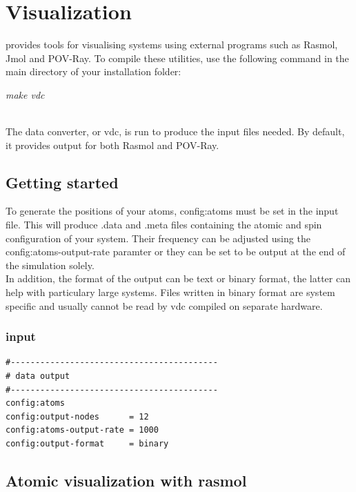 \chapter{Visualization}\label{chap:visualization}

\vampire provides tools for visualising systems using external programs such as Rasmol, Jmol and POV-Ray. To compile these utilities, use the following command in the main directory of your \vampire installation folder:

\begin{minipage}[c]{\textwidth}
\centering
\textit{make vdc}
\end{minipage}\\

 The \vampire data converter, or vdc, is run to produce the input files needed. By default, it provides output for both Rasmol and POV-Ray.


\section*{Getting started}
To generate the positions of your atoms, config:atoms must be set in the input file. This will produce .data and .meta files containing the atomic and spin configuration of your system. Their frequency can be adjusted using the config:atoms-output-rate paramter or they can be set to be output at the end of the simulation solely.\\

In addition, the format of the output can be text or binary format, the latter can help with particulary large systems. Files written in binary format are system specific and usually cannot be read by vdc compiled on separate hardware.\\

\subsection*{input}
{\footnotesize
\begin{verbatim}
#------------------------------------------
# data output
#------------------------------------------
config:atoms
config:output-nodes      = 12
config:atoms-output-rate = 1000
config:output-format     = binary
\end{verbatim}
}

\section*{Atomic visualization with rasmol}

